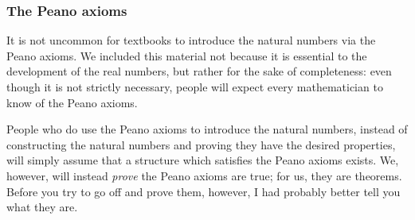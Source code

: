 \subsubsection{The Peano axioms}

It is not uncommon for textbooks to introduce the natural numbers via the Peano axioms.  We included this material not because it is essential to the development of the real numbers, but rather for the sake of completeness:  even though it is not strictly necessary, people will expect every mathematician to know of the Peano axioms.

People who do use the Peano axioms to introduce the natural numbers, instead of constructing the natural numbers and proving they have the desired properties, will simply assume that a structure which satisfies the Peano axioms exists.  We, however, will instead \emph{prove} the Peano axioms are true; for us, they are theorems.  Before you try to go off and prove them, however, I had probably better tell you what they are.
